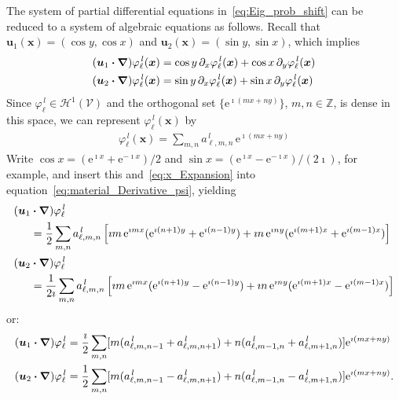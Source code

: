 \documentclass[leqno,onefignum,onetabnum]{siamltex1213}
\newcommand{\e}{\mathrm{e}}
\newcommand{\Vc}{\mathcal{V}}
\newcommand{\Hs}{\mathscr{H}}
\newcommand\bnabla{\mbox{\boldmath${\nabla}$}}
\providecommand\bcdot{\boldsymbol{\cdot}}
\newcommand{\vecx}{\boldsymbol{x}}
\newcommand{\vecu}{\boldsymbol{u}}
\begin{document}
The system of partial differential equations
in~\eqref{eq:Eig_prob_shift} can be reduced to a system of algebraic 
equations as follows. Recall that
$\vecu _1(\vecx)=(\cos{y},\cos{x})$ and
$\vecu _2(\vecx)=(\sin{y},\sin{x})$, which implies 
%
\begin{align}\label{eq:material_Derivative_psi}
  (\vecu _1\bcdot\bnabla )\varphi_\ell^{\,l}(\vecx)
          &=\cos{y}\,\partial_x\varphi_\ell^{\,l}(\vecx)+\cos{x}\,\partial_y\varphi_\ell^{\,l}(\vecx)\\
  (\vecu _2\bcdot\bnabla )\varphi_\ell^{\,l}(\vecx)
          &=\sin{y}\,\partial_x\varphi_\ell^{\,l}(\vecx)+\sin{x}\,\partial_y\varphi_\ell^{\,l}(\vecx)\notag
\end{align}
%
Since $\varphi_\ell^{\,l}\in\Hs^1(\Vc)$ and the orthogonal set $\{\e^{\imath (mx+ny)}\}$,
$m,n\in\mathbb{Z}$, is dense in this space, we can represent
$\varphi_\ell^{\,l}(\vecx)$ by
%
\begin{align}\label{eq:x_Expansion}
  \varphi_\ell^{\,l}(\vecx)=\sum_{m,n}a^{\,l}_{\ell,m,n}\,\e^{\imath (mx+ny)}
\end{align}
%
Write $\cos{x}=(\e^{\imath x}+\e^{-\imath x})/2$ and
$\sin{x}=(\e^{\imath x}-\e^{-\imath x})/(2\imath)$, for example, and insert this
and~\eqref{eq:x_Expansion} into
equation~\eqref{eq:material_Derivative_psi}, yielding 
%
\begin{align}\label{eq:Advection_Fourier}
  (\vecu _1&\bcdot\bnabla )\varphi_\ell^{\,l}\\
    &=\frac{1}{2}\sum_{m,n}a^{\,l}_{\ell,m,n}\left[
        \imath m\,\e^{\imath mx}(\e^{\imath(n+1)y}+\e^{\imath(n-1)y})
        +\imath n\,\e^{\imath ny}(\e^{\imath(m+1)x}+\e^{\imath(m-1)x})
                       \right]
    \notag\\
%    
  (\vecu _2&\bcdot\bnabla )\varphi_\ell^{\,l}\notag\\
    &=\frac{1}{2\imath}\sum_{m,n}a^{\,l}_{\ell,m,n}\left[
        \imath m\,\e^{\imath mx}(\e^{\imath(n+1)y}-\e^{\imath(n-1)y})
        +\imath n\,\e^{\imath ny}(\e^{\imath(m+1)x}-\e^{\imath(m-1)x})
                       \right]
                       \notag
\end{align}
%
or:
%
\begin{align}\label{eq:Algebraic_advection}
  (\vecu _1\bcdot\bnabla )\varphi_\ell^{\,l}
    &=\frac{\imath}{2}\sum_{m,n}
    [m(a^{\,l}_{\ell,m,n-1}+a^{\,l}_{\ell,m,n+1})+n(a^{\,l}_{\ell,m-1,n}+a^{\,l}_{\ell,m+1,n})]\e^{\imath (mx+ny)}
   \notag\\
  (\vecu _2\bcdot\bnabla )\varphi_\ell^{\,l}
    &=\frac{1}{2}\sum_{m,n}
    [m(a^{\,l}_{\ell,m,n-1}-a^{\,l}_{\ell,m,n+1})+n(a^{\,l}_{\ell,m-1,n}-a^{\,l}_{\ell,m+1,n})]\e^{\imath (mx+ny)} .
\end{align}
\end{document}
